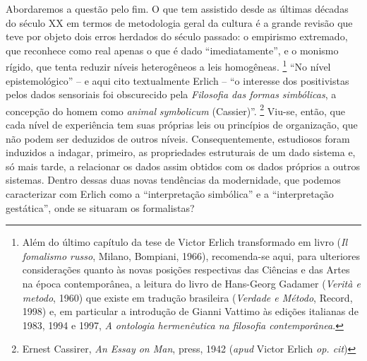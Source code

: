 Abordaremos a questão pelo fim. O que tem assistido desde as últimas
décadas do século XX em termos de metodologia geral da cultura é a
grande revisão que teve por objeto dois erros herdados do século
passado: o empirismo extremado, que reconhece como real apenas o que é
dado ``imediatamente'', e o monismo rígido, que tenta reduzir níveis
heterogêneos a leis homogêneas. \footnote{Além do último capítulo da
  tese de Victor Erlich transformado em livro (\emph{Il fomalismo
  russo}, Milano, Bompiani, 1966), recomenda-se aqui, para ulteriores
  considerações quanto às novas posições respectivas das Ciências e das
  Artes na época contemporânea, a leitura do livro de Hans-Georg Gadamer
  (\emph{Verità e metodo}, 1960) que existe em tradução brasileira
  (\emph{Verdade e Método}, Record, 1998) e, em particular a introdução
  de Gianni Vattimo às edições italianas de 1983, 1994 e 1997, \emph{A
  ontologia hermenêutica na filosofia contemporânea}.} ``No nível
epistemológico'' -- e aqui cito textualmente Erlich -- ``o interesse dos
positivistas pelos dados sensoriais foi obscurecido pela \emph{Filosofia
das formas simbólicas}, a concepção do homem como \emph{animal}
\emph{symbolicum} (Cassier)''. \footnote{Ernest Cassirer, \emph{An Essay
  on Man}, press, 1942 (\emph{apud} Victor Erlich \emph{op. cit})}
Viu-se, então, que cada nível de experiência tem suas próprias leis ou
princípios de organização, que não podem ser deduzidos de outros níveis.
Consequentemente, estudiosos foram induzidos a indagar, primeiro, as
propriedades estruturais de um dado sistema e, só mais tarde, a
relacionar os dados assim obtidos com os dados próprios a outros
sistemas. Dentro dessas duas novas tendências da modernidade, que
podemos caracterizar com Erlich como a ``interpretação simbólica'' e a
``interpretação gestática'', onde se situaram os formalistas?

